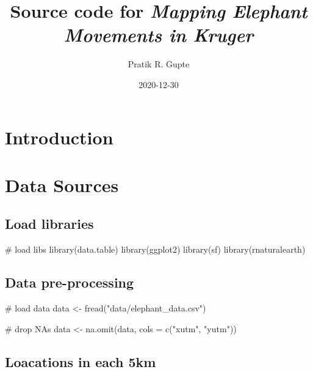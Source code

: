 \documentclass[]{article}
\title{Source code for \emph{Mapping Elephant Movements in Kruger}}
\author{Pratik R. Gupte}
\date{2020-12-30}
\newenvironment{Shaded}{}{}
\newcommand{\CommentTok}[1]{\textcolor[rgb]{0.00,0.50,0.00}{#1}}
\newcommand{\DataTypeTok}[1]{#1}
\newcommand{\KeywordTok}[1]{\textcolor[rgb]{0.00,0.00,1.00}{#1}}
\newcommand{\NormalTok}[1]{#1}
\newcommand{\StringTok}[1]{\textcolor[rgb]{0.00,0.50,0.50}{#1}}
\begin{document}
\maketitle

{
\setcounter{tocdepth}{2}
\tableofcontents
}
\hypertarget{introduction}{%
\section{Introduction}\label{introduction}}

\hypertarget{data-sources}{%
\section{Data Sources}\label{data-sources}}

\hypertarget{load-libraries}{%
\subsection{Load libraries}\label{load-libraries}}

\begin{Shaded}
\begin{Highlighting}[]
\CommentTok{# load libs}
\KeywordTok{library}\NormalTok{(data.table)}
\KeywordTok{library}\NormalTok{(ggplot2)}
\KeywordTok{library}\NormalTok{(sf)}
\KeywordTok{library}\NormalTok{(rnaturalearth)}
\end{Highlighting}
\end{Shaded}

\hypertarget{data-pre-processing}{%
\subsection{Data pre-processing}\label{data-pre-processing}}

\begin{Shaded}
\begin{Highlighting}[]
\CommentTok{# load data}
\NormalTok{data <-}\StringTok{ }\KeywordTok{fread}\NormalTok{(}\StringTok{"data/elephant_data.csv"}\NormalTok{)}

\CommentTok{# drop NAs}
\NormalTok{data <-}\StringTok{ }\KeywordTok{na.omit}\NormalTok{(data, }\DataTypeTok{cols =} \KeywordTok{c}\NormalTok{(}\StringTok{"xutm"}\NormalTok{, }\StringTok{"yutm"}\NormalTok{))}
\end{Highlighting}
\end{Shaded}

\hypertarget{loacations-in-each-5km}{%
\subsection{Loacations in each 5km}\label{loacations-in-each-5km}}
\end{document}
